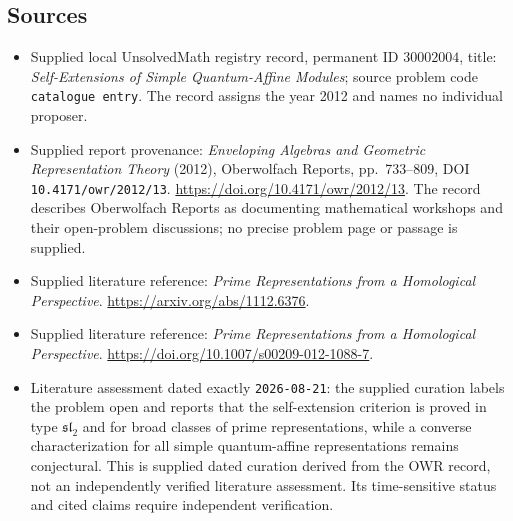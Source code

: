 \documentclass[11pt]{article}
\begin{document}
\subsection{Sources}
\begin{itemize}
\item Supplied local UnsolvedMath registry record, permanent ID \(30002004\), title: \emph{Self-Extensions of Simple Quantum-Affine Modules}; source problem code \texttt{catalogue entry}. The record assigns the year 2012 and names no individual proposer.
\item Supplied report provenance: \emph{Enveloping Algebras and Geometric Representation Theory} (2012), Oberwolfach Reports, pp.~733--809, DOI \texttt{10.4171/owr/2012/13}. \url{https://doi.org/10.4171/owr/2012/13}. The record describes Oberwolfach Reports as documenting mathematical workshops and their open-problem discussions; no precise problem page or passage is supplied.
\item Supplied literature reference: \emph{Prime Representations from a Homological Perspective}. \url{https://arxiv.org/abs/1112.6376}.
\item Supplied literature reference: \emph{Prime Representations from a Homological Perspective}. \url{https://doi.org/10.1007/s00209-012-1088-7}.
\item Literature assessment dated exactly \texttt{2026-08-21}: the supplied curation labels the problem open and reports that the self-extension criterion is proved in type \(\mathfrak{sl}_2\) and for broad classes of prime representations, while a converse characterization for all simple quantum-affine representations remains conjectural. This is supplied dated curation derived from the OWR record, not an independently verified literature assessment. Its time-sensitive status and cited claims require independent verification.
\end{itemize}
\end{document}
